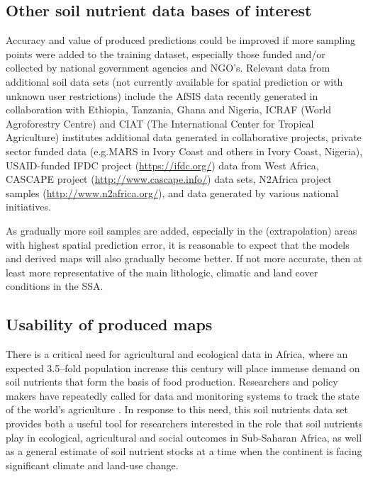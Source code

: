 \begin{linenumbers}
\subsection{Other soil nutrient data bases of interest}

Accuracy and value of produced predictions could be improved if more sampling points were added to the training dataset, especially those funded and/or collected by national government agencies and NGO's. Relevant data from additional soil data sets (not currently available for spatial prediction or with unknown user restrictions) include the AfSIS data recently generated in collaboration with Ethiopia, Tanzania, Ghana and Nigeria, ICRAF (World Agroforestry Centre) and CIAT (The International Center for Tropical Agriculture) institutes additional data generated in collaborative projects, private sector funded data (e.g.\@ MARS in Ivory Coast and others in Ivory Coast, Nigeria), USAID-funded IFDC project (\url{https://ifdc.org/}) data from West Africa, CASCAPE project (\url{http://www.cascape.info/}) data sets, N2Africa project samples (\url{http://www.n2africa.org/}), and data generated by various national initiatives.\par

As gradually more soil samples are added, especially in the (extrapolation) areas with highest spatial prediction error, it is reasonable to expect that the models and derived maps will also gradually become better. If not more accurate, then at least more representative of the main lithologic, climatic and land cover conditions in the SSA. \par

\subsection{Usability of produced maps}

There is a critical need for agricultural and ecological data in Africa, where an expected 3.5--fold population increase this century \citep{Gerland2014world} will place immense demand on soil nutrients that form the basis of food production. Researchers and policy makers have repeatedly called for data and monitoring systems to track the state of the world's agriculture \citep{sachs2010monitoring}. In response to this need, this soil nutrients data set provides both a useful tool for researchers interested in the role that soil nutrients play in ecological, agricultural and social outcomes in Sub-Saharan Africa, as well as a general estimate of soil nutrient stocks at a time when the continent is facing significant climate and land-use change. \par


\end{linenumbers}
